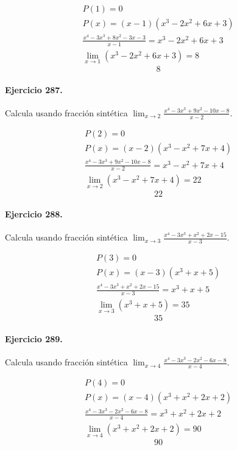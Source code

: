 \documentclass[11pt,a4paper]{article}
\begin{document}
\[
\begin{aligned}
P(1)=0\\
P(x)=(x-1)(x^3 - 2x^2 + 6x + 3)\\
\frac{x^4 - 3x^3 + 8x^2 - 3x - 3}{x-1}=x^3 - 2x^2 + 6x + 3\\
\lim_{x\to 1}(x^3 - 2x^2 + 6x + 3)=8
\end{aligned}
\]
\[\boxed{8}\]


\paragraph{Ejercicio 287.} Calcula usando fracción sintética $\displaystyle\lim_{x\to 2}\frac{x^4 - 3x^3 + 9x^2 - 10x - 8}{x-2}$. 

\[
\begin{aligned}
P(2)=0\\
P(x)=(x-2)(x^3 - x^2 + 7x + 4)\\
\frac{x^4 - 3x^3 + 9x^2 - 10x - 8}{x-2}=x^3 - x^2 + 7x + 4\\
\lim_{x\to 2}(x^3 - x^2 + 7x + 4)=22
\end{aligned}
\]
\[\boxed{22}\]


\paragraph{Ejercicio 288.} Calcula usando fracción sintética $\displaystyle\lim_{x\to 3}\frac{x^4 - 3x^3 + x^2 + 2x - 15}{x-3}$. 

\[
\begin{aligned}
P(3)=0\\
P(x)=(x-3)(x^3 + x + 5)\\
\frac{x^4 - 3x^3 + x^2 + 2x - 15}{x-3}=x^3 + x + 5\\
\lim_{x\to 3}(x^3 + x + 5)=35
\end{aligned}
\]
\[\boxed{35}\]


\paragraph{Ejercicio 289.} Calcula usando fracción sintética $\displaystyle\lim_{x\to 4}\frac{x^4 - 3x^3 - 2x^2 - 6x - 8}{x-4}$. 

\[
\begin{aligned}
P(4)=0\\
P(x)=(x-4)(x^3 + x^2 + 2x + 2)\\
\frac{x^4 - 3x^3 - 2x^2 - 6x - 8}{x-4}=x^3 + x^2 + 2x + 2\\
\lim_{x\to 4}(x^3 + x^2 + 2x + 2)=90
\end{aligned}
\]
\[\boxed{90}\]
\end{document}
